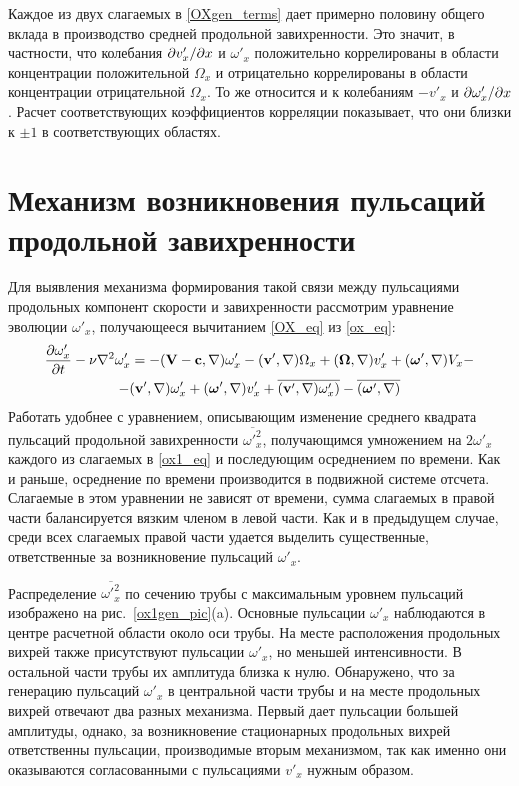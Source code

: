 Каждое из двух слагаемых в \eqref{OXgen_terms} дает примерно половину общего вклада в производство средней продольной завихренности. Это значит, в частности, что колебания $\partial v'_x/\partial x$ и $\omega'_x$ положительно коррелированы в области концентрации положительной $\Omega_x$ и отрицательно коррелированы в области концентрации отрицательной $\Omega_x$. То же относится и к колебаниям $-v'_x$ и $\partial \omega'_x/\partial x$. Расчет соответствующих коэффициентов корреляции показывает, что они близки к $\pm1$ в соответствующих областях. 


\section{Механизм возникновения пульсаций продольной завихренности}

Для выявления механизма формирования такой связи между пульсациями продольных компонент скорости и завихренности рассмотрим уравнение эволюции $\omega'_x$, получающееся вычитанием \eqref{OX_eq} из \eqref{ox_eq}:
\begin{multline}\label{ox1_eq}
\frac{\partial \omega'_x}{\partial t} - \nu \nabla^2 \omega'_x = - (\mathbf{V} - \mathbf{c}, \nabla) \omega'_x - (\mathbf{v}', \nabla) \Omega_x
+(\mbox{\boldmath$\Omega$}, \nabla) v'_x + (\mbox{\boldmath$\omega$}', \nabla) V_x -\\- (\mathbf{v}', \nabla) \omega'_x  + (\mbox{\boldmath$\omega$}', \nabla) v'_x  + \overline{(\mathbf{v}', \nabla) \omega'_x)}  - \overline{(\mbox{\boldmath$\omega$}', \nabla)}
\end{multline}
Работать удобнее с уравнением, описывающим изменение среднего квадрата пульсаций продольной завихренности $\overline{\omega'^2_x}$, получающимся умножением на $2\omega'_x$ каждого из слагаемых в \eqref{ox1_eq} и последующим осреднением по времени. Как и раньше, осреднение по времени производится в подвижной системе отсчета. Слагаемые в этом уравнении не зависят от времени, сумма слагаемых в правой части балансируется вязким членом в левой части. Как и в предыдущем случае, среди всех слагаемых правой части удается выделить существенные, ответственные за возникновение пульсаций $\omega'_x$.


Распределение $\overline{\omega'^2_x}$ по сечению трубы с максимальным уровнем пульсаций изображено на рис.~\ref{ox1gen_pic}(a). Основные пульсации $\omega'_x$ наблюдаются в центре расчетной области около оси трубы. На месте расположения продольных вихрей также присутствуют пульсации $\omega'_x$, но меньшей интенсивности. В остальной части трубы их амплитуда близка к нулю. Обнаружено, что за генерацию пульсаций $\omega'_x$ в центральной части трубы и на месте продольных вихрей отвечают два разных механизма. Первый дает пульсации большей амплитуды, однако, за возникновение стационарных продольных вихрей ответственны пульсации, производимые вторым механизмом, так как именно они оказываются согласованными с пульсациями $v'_x$ нужным образом.



